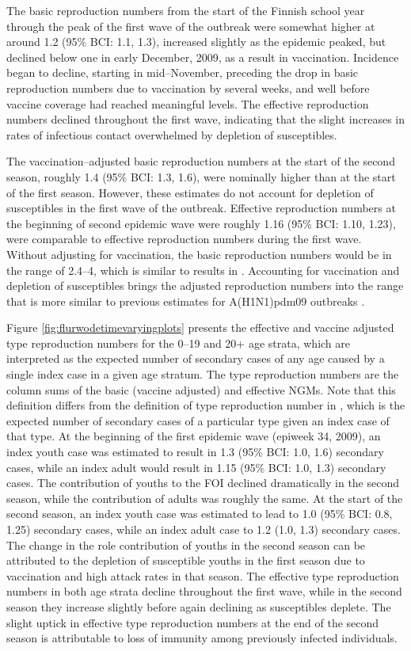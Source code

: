 The basic reproduction numbers from the start of the Finnish school year through the peak of the first wave of the outbreak were somewhat higher at around 1.2 (95\% BCI: 1.1, 1.3), increased slightly as the epidemic peaked, but declined below one in early December, 2009, as a result in vaccination. Incidence began to decline, starting in mid--November, preceding the drop in basic reproduction numbers due to vaccination by several weeks, and well before vaccine coverage had reached meaningful levels. The effective reproduction numbers declined throughout the first wave, indicating that the slight increases in rates of infectious contact overwhelmed by depletion of susceptibles.

The vaccination--adjusted basic reproduction numbers at the start of the second season, roughly 1.4 (95\% BCI: 1.3, 1.6), were nominally higher than at the start of the first season. However, these estimates do not account for depletion of susceptibles in the first wave of the outbreak. Effective reproduction numbers at the beginning of second epidemic wave were roughly 1.16 (95\% BCI: 1.10, 1.23), were comparable to effective reproduction numbers during the first wave. Without adjusting for vaccination, the basic reproduction numbers would be in the range of 2.4--4, which is similar to results in \cite{shubin2016revealing}. Accounting for vaccination and depletion of susceptibles brings the adjusted reproduction numbers into the range that is more similar to previous estimates for A(H1N1)pdm09 outbreaks \cite{biggerstaff2014estimates}. 

Figure \ref{fig:flurwodetimevaryingplots} presents the effective and vaccine adjusted type reproduction numbers for the 0--19 and 20+ age strata, which are interpreted as the expected number of secondary cases of any age caused by a single index case in a given age stratum. The type reproduction numbers are the column sums of the basic (vaccine adjusted) and effective NGMs. Note that this definition differs from the definition of type reproduction number in \cite{heesterbeek2007type}, which is the expected number of secondary cases of a particular type given an index case of that type. At the beginning of the first epidemic wave (epiweek 34, 2009), an index youth case was estimated to result in 1.3 (95\% BCI: 1.0, 1.6) secondary cases, while an index adult would result in 1.15 (95\% BCI: 1.0, 1.3) secondary cases. The contribution of youths to the FOI declined dramatically in the second season, while the contribution of adults was roughly the same. At the start of the second season, an index youth case was estimated to lead to 1.0 (95\% BCI: 0.8, 1.25) secondary cases, while an index adult case to 1.2 (1.0, 1.3) secondary cases. The change in the role contribution of youths in the second season can be attributed to the depletion of susceptible youths in the first season due to vaccination and high attack rates in that season. The effective type reproduction numbers in both age strata decline throughout the first wave, while in the second season they increase slightly before again declining as susceptibles deplete. The slight uptick in effective type reproduction numbers at the end of the second season is attributable to loss of immunity among previously infected individuals.  

